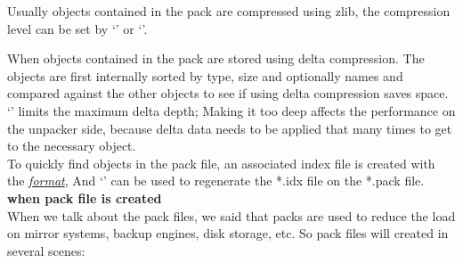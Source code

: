 Usually objects contained in the pack are compressed using zlib, the compression level
can be set by `\textbf{}' or `\textbf{}'.

When objects contained in the pack are stored using delta compression. The objects
are first internally sorted by type, size and optionally names and compared against
the other objects to see if using delta compression saves space. `\textbf{}'
limits the maximum delta depth; Making it too deep affects the performance on the unpacker side,
because delta data needs to be applied that many times to get to the necessary object.
\\

To quickly find objects in the pack file, an associated index file is created with the
\emph{\href{https://github.com/git/git/blob/master/Documentation/technical/pack-format.txt\#L161}{format}},
And `\emph{}' can be used to regenerate the *.idx file on the *.pack file.
\\

\textbullet\textbf{\large{ when pack file is created}}\\

When we talk about the pack files, we said that packs are used to reduce the load on mirror systems,
backup engines, disk storage, etc. So pack files will created in several scenes:

